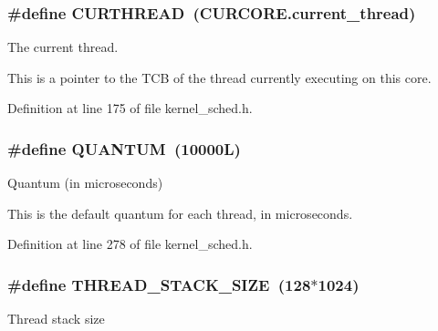 \subsubsection[{\texorpdfstring{C\+U\+R\+T\+H\+R\+E\+AD}{CURTHREAD}}]{\setlength{\rightskip}{0pt plus 5cm}\#define C\+U\+R\+T\+H\+R\+E\+AD~(C\+U\+R\+C\+O\+R\+E.\+current\+\_\+thread)}\hypertarget{group__scheduler_ga587a82c8931f0df72f43cc913ceb7e27}{}\label{group__scheduler_ga587a82c8931f0df72f43cc913ceb7e27}


The current thread. 

This is a pointer to the T\+CB of the thread currently executing on this core. 

Definition at line 175 of file kernel\+\_\+sched.\+h.

\subsubsection[{\texorpdfstring{Q\+U\+A\+N\+T\+UM}{QUANTUM}}]{\setlength{\rightskip}{0pt plus 5cm}\#define Q\+U\+A\+N\+T\+UM~(10000\+L)}\hypertarget{group__scheduler_gabc4f0f9abea1b5443308e4ea84b52b21}{}\label{group__scheduler_gabc4f0f9abea1b5443308e4ea84b52b21}


Quantum (in microseconds) 

This is the default quantum for each thread, in microseconds. 

Definition at line 278 of file kernel\+\_\+sched.\+h.

\subsubsection[{\texorpdfstring{T\+H\+R\+E\+A\+D\+\_\+\+S\+T\+A\+C\+K\+\_\+\+S\+I\+ZE}{THREAD_STACK_SIZE}}]{\setlength{\rightskip}{0pt plus 5cm}\#define T\+H\+R\+E\+A\+D\+\_\+\+S\+T\+A\+C\+K\+\_\+\+S\+I\+ZE~(128$\ast$1024)}\hypertarget{group__scheduler_ga90b7a8cb7bc3fdbd98014a3e15ee6e9a}{}\label{group__scheduler_ga90b7a8cb7bc3fdbd98014a3e15ee6e9a}
Thread stack size 


